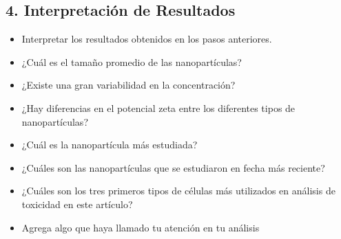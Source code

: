 \documentclass{article}
\begin{document}
\subsection*{4. Interpretaci\'on de Resultados}
\begin{itemize}
    \item Interpretar los resultados obtenidos en los pasos anteriores.
    \item ¿Cu\'al es el tamaño promedio de las nanopart\'iculas?
    \item ¿Existe una gran variabilidad en la concentraci\'on?
    \item ¿Hay diferencias en el potencial zeta entre los diferentes tipos de nanopart\'iculas?
    \item ¿Cu\'al es la nanopart\'icula m\'as estudiada?
    \item ¿Cu\'ales son las nanopart\'iculas que se estudiaron en fecha m\'as reciente?
    \item ¿Cu\'ales son los tres primeros tipos de c\'elulas m\'as utilizados en an\'alisis de toxicidad en este art\'iculo?
    \item Agrega algo que haya llamado tu atención en tu an\'alisis
\end{itemize}
\end{document}
